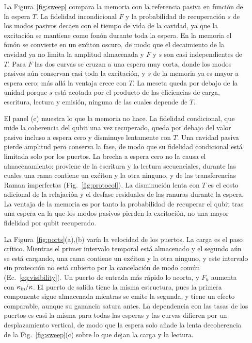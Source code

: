 \documentclass[aps,pra,twocolumn,groupedaddress,amsmath,amssymb,floatfix]{revtex4-2}
\begin{document}
La Figura~\ref{fig:sweep} compara la memoria con la referencia pasiva en funci\'on de la espera $T$. La fidelidad incondicional $F$ y la probabilidad de recuperaci\'on $s$ de los modos pasivos decaen con el tiempo de vida de la cavidad, ya que la excitaci\'on se mantiene como fon\'on durante toda la espera. En la memoria el fon\'on se convierte en un ex\'citon oscuro, de modo que el decaimiento de la cavidad ya no limita la amplitud almacenada y $F$ y $s$ son casi independientes de $T$. Para $F$ las dos curvas se cruzan a una espera muy corta, donde los modos pasivos a\'un conservan casi toda la excitaci\'on, y $s$ de la memoria ya es mayor a espera cero; m\'as all\'a la ventaja crece con $T$. La meseta queda por debajo de la unidad porque $s$ est\'a acotada por el producto de las eficiencias de carga, escritura, lectura y emisi\'on, ninguna de las cuales depende de $T$.

El panel (c) muestra lo que la memoria no hace. La fidelidad condicional, que mide la coherencia del qubit una vez recuperado, queda por debajo del valor pasivo incluso a espera cero y disminuye lentamente con $T$. Una cavidad pasiva pierde amplitud pero conserva la fase, de modo que su fidelidad condicional est\'a limitada solo por los puertos. La brecha a espera cero no la causa el almacenamiento: proviene de la escritura y la lectura secuenciales, durante las cuales una rama contiene un ex\'citon y la otra ninguno, y de las transferencias Raman imperfectas (Fig.~\ref{fig:protocol}). La disminuci\'on lenta con $T$ es el costo adicional de la relajaci\'on y el desfase residuales de las ranuras durante la espera. La ventaja de la memoria es por tanto la probabilidad de recuperar el qubit tras una espera en la que los modos pasivos pierden la excitaci\'on, no una mayor fidelidad por qubit recuperado.

La Figura~\ref{fig:ports}(a),(b) var\'ia la velocidad de los puertos. La carga es el paso cr\'itico. Mientras el primer intervalo temporal est\'a almacenado y el segundo a\'un se est\'a cargando, una rama contiene un ex\'citon y la otra ninguno, y este intervalo sin protecci\'on no est\'a cubierto por la cancelaci\'on de modo com\'un (Ec.~\eqref{eq:visibility}). Un puerto de entrada m\'as r\'apido lo acorta, y $F_h$ aumenta con $\kappa_{\rm in}/\kappa$. El puerto de salida tiene la misma estructura, pues la primera componente sigue almacenada mientras se emite la segunda, y tiene un efecto comparable, aunque su ganancia satura antes. La dependencia con las tasas de los puertos es casi la misma para todas las esperas y las curvas difieren por un desplazamiento vertical, de modo que la espera solo a\~nade la lenta decoherencia de la Fig.~\ref{fig:sweep}(c) sobre lo que dejan la carga y la lectura.
\end{document}
